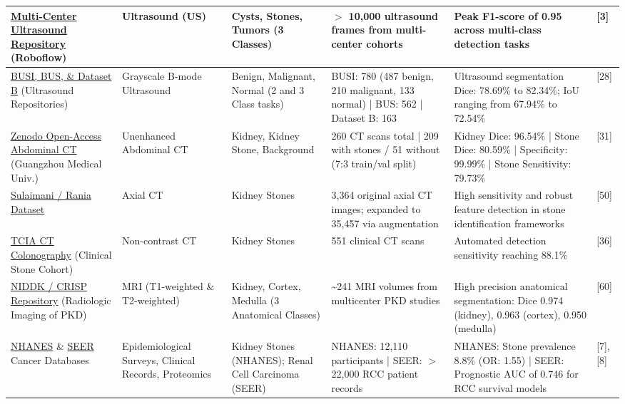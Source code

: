 \documentclass{article}
\begin{document}
\begin{longtable}{|L{3.0cm}|L{1.8cm}|L{2.5cm}|L{3.2cm}|L{4.2cm}|L{1.8cm}|}
\hline
\href{https://universe.roboflow.com/proyecto-1/tesis-iz9ji}{Multi-Center Ultrasound Repository} (Roboflow) & Ultrasound (US) & Cysts, Stones, Tumors (3 Classes) & $>$ 10,000 ultrasound frames from multi-center cohorts & Peak F1-score of 0.95 across multi-class detection tasks & [3] \\
\hline
\href{https://www.sciencedirect.com/science/article/pii/S2352340919312181}{BUSI, BUS, \& Dataset B} (Ultrasound Repositories) & Grayscale B-mode Ultrasound & Benign, Malignant, Normal (2 and 3 Class tasks) & BUSI: 780 (487 benign, 210 malignant, 133 normal) | BUS: 562 | Dataset B: 163 & Ultrasound segmentation Dice: 78.69\% to 82.34\%; IoU ranging from 67.94\% to 72.54\% & [28] \\
\hline
\href{https://zenodo.org/record/6042410}{Zenodo Open-Access Abdominal CT} (Guangzhou Medical Univ.) & Unenhanced Abdominal CT & Kidney, Kidney Stone, Background & 260 CT scans total | 209 with stones / 51 without (7:3 train/val split) & Kidney Dice: 96.54\% | Stone Dice: 80.59\% | Specificity: 99.99\% | Stone Sensitivity: 79.73\% & [31] \\
\hline
\href{https://www.kaggle.com/datasets/orvile/axial-ct-imaging-dataset-kidney-stone-detection}{Sulaimani / Rania Dataset} & Axial CT & Kidney Stones & 3,364 original axial CT images; expanded to 35,457 via augmentation & High sensitivity and robust feature detection in stone identification frameworks & [50] \\
\hline
\href{https://www.cancerimagingarchive.net/collection/ct-colonography/}{TCIA CT Colonography} (Clinical Stone Cohort) & Non-contrast CT & Kidney Stones & 551 clinical CT scans & Automated detection sensitivity reaching 88.1\% & [36] \\
\hline
\href{https://www.niddkrepository.org/studies/crisp/}{NIDDK / CRISP Repository} (Radiologic Imaging of PKD) & MRI (T1-weighted \& T2-weighted) & Kidney, Cortex, Medulla (3 Anatomical Classes) & \textasciitilde{}241 MRI volumes from multicenter PKD studies & High precision anatomical segmentation: Dice 0.974 (kidney), 0.963 (cortex), 0.950 (medulla) & [60] \\
\hline
\href{https://www.cdc.gov/nchs/nhanes/index.htm}{NHANES} \& \href{https://seer.cancer.gov/}{SEER} Cancer Databases & Epidemiological Surveys, Clinical Records, Proteomics & Kidney Stones (NHANES); Renal Cell Carcinoma (SEER) & NHANES: 12,110 participants | SEER: $>$ 22,000 RCC patient records & NHANES: Stone prevalence 8.8\% (OR: 1.55) | SEER: Prognostic AUC of 0.746 for RCC survival models & [7], [8] \\

\end{longtable}
\end{document}
